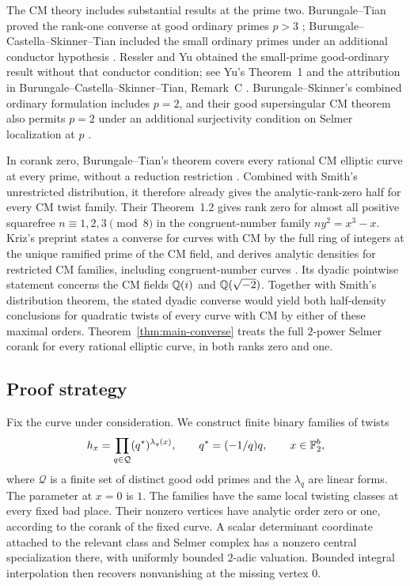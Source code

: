 The CM theory includes substantial results at the prime two.
Burungale--Tian proved the rank-one converse at good ordinary primes
$p>3$ \citep{BurungaleTian2020};
Burungale--Castella--Skinner--Tian included the small ordinary primes
under an additional conductor hypothesis
\citep[Theorem~A]{BurungaleCastellaSkinnerTian2022}.
Ressler and Yu obtained the small-prime good-ordinary result without
that conductor condition; see Yu's Theorem~1 and the attribution in
Burungale--Castella--Skinner--Tian, Remark~C
\citep{Yu2021,BurungaleCastellaSkinnerTian2022}.
Burungale--Skinner's combined ordinary formulation includes $p=2$,
and their good supersingular CM theorem also permits $p=2$ under an
additional surjectivity condition on Selmer localization at $p$
\citep[Theorems~A.3 and~A.1]{BurungaleSkinner2024}.

In corank zero, Burungale--Tian's theorem covers every rational CM
elliptic curve at every prime, without a reduction restriction
\citep[Theorem~1.1]{BurungaleTian2026}.
Combined with Smith's unrestricted distribution, it therefore already
gives the analytic-rank-zero half for every CM twist family.
Their Theorem~1.2 gives rank zero for almost all positive squarefree
$n\equiv1,2,3\pmod8$ in the congruent-number family
$ny^2=x^3-x$.
Kriz's preprint states a converse for curves with CM by the full ring
of integers at the unique ramified prime of the CM field, and derives
analytic densities for restricted CM families, including congruent-number
curves \citep[Theorems~1.1 and~10.17]{Kriz2022}.
Its dyadic pointwise statement concerns the CM fields $\mathbb Q(i)$ and
$\mathbb Q(\sqrt{-2})$.
Together with Smith's distribution theorem, the stated dyadic converse
would yield both half-density conclusions for quadratic twists of every
curve with CM by either of these maximal orders.
Theorem~\ref{thm:main-converse} treats the full $2$-power Selmer corank
for every rational elliptic curve, in both ranks zero and one.

\subsection{Proof strategy}

Fix the curve under consideration. We construct finite binary families
of twists
\[
 h_x=\prod_{q\in\mathcal Q}(q^*)^{\lambda_q(x)},\qquad
 q^*=(-1/q)q,\qquad x\in\mathbb F_2^b,
\]
where $\mathcal Q$ is a finite set of distinct good odd primes and the
$\lambda_q$ are linear forms. The parameter at $x=0$ is $1$.
The families have the same local twisting classes at every fixed bad
place. Their nonzero vertices have analytic order zero or one, according
to the corank of the fixed curve. A scalar determinant coordinate
attached to the relevant class and Selmer complex has a nonzero central
specialization there, with uniformly bounded $2$-adic valuation.
Bounded integral interpolation then recovers nonvanishing at the missing
vertex $0$.

